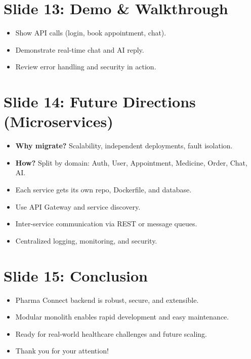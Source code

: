 \documentclass[12pt]{article}
\begin{document}

\section*{Slide 13: Demo \& Walkthrough}
\begin{itemize}[leftmargin=1cm]
    \item Show API calls (login, book appointment, chat).
    \item Demonstrate real-time chat and AI reply.
    \item Review error handling and security in action.
\end{itemize}


\section*{Slide 14: Future Directions (Microservices)}
\begin{itemize}[leftmargin=1cm]
    \item \textbf{Why migrate?} Scalability, independent deployments, fault isolation.
    \item \textbf{How?} Split by domain: Auth, User, Appointment, Medicine, Order, Chat, AI.
    \item Each service gets its own repo, Dockerfile, and database.
    \item Use API Gateway and service discovery.
    \item Inter-service communication via REST or message queues.
    \item Centralized logging, monitoring, and security.
\end{itemize}


\section*{Slide 15: Conclusion}
\begin{itemize}[leftmargin=1cm]
    \item Pharma Connect backend is robust, secure, and extensible.
    \item Modular monolith enables rapid development and easy maintenance.
    \item Ready for real-world healthcare challenges and future scaling.
    \item Thank you for your attention!
\end{itemize}
\end{document}
